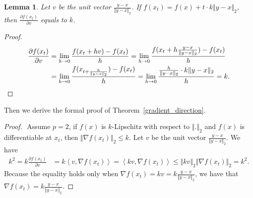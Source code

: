 \documentclass{article}
\newcommand{\tpdv}[2]{\frac{\partial{#1}}{\partial{#2}}}
\newtheorem{lemma}{Lemma}
\begin{document}
\begin{lemma}
Let $v$ be the unit vector $\frac{y-x}{\Vert y -x \Vert_2}$. If $f(x_t) = f(x)+t\cdot k\Vert y - x \Vert_2$, then $\tpdv{f(x_t)}{v}$ equals to $k$. 
\end{lemma}

\begin{proof}
\begin{equation}
\begin{aligned}
\vspace{-20pt}
\tpdv{f(x_t)}{v} 
&= \lim\limits_{h\rightarrow0} \frac{f(x_t+hv)-f(x_t)}{h} =\lim\limits_{h\rightarrow0} \frac{f(x_t+h\frac{y-x}{\Vert y-x \Vert_2})-f(x_t)}{h} \\ 
& =\lim\limits_{h\rightarrow0}\frac{f(x_{t+\frac{h}{\Vert y-x \Vert_2}})-f(x_t)}{h}  =\lim\limits_{h\rightarrow0}\frac{\frac{h}{\Vert y-x \Vert_2}\cdot k\Vert y-x \Vert_2}{h}=k. \nonumber \qedhere
\end{aligned}
\end{equation}
\end{proof}
Then we derive the formal proof of Theorem~\ref{gradient_direction}. 

\begin{proof} $ $ 
Assume $p=2$, if $f(x)$ is $k$-Lipschitz with respect to $\Vert.\Vert_2$ and $f(x)$ is differentiable at $x_t$, then $\Vert \nabla f(x_t) \Vert_2 \leq k$.  Let $v$ be the unit vector $\frac{y-x}{\Vert y -x \Vert_2}$. We have 
\begin{align}
k^2 =k\tpdv{f(x_t)}{v} &=k\left<v,\nabla f(x_t)\right>= \left<kv, \nabla f(x_t) \right> \leq \Vert kv \Vert_2\Vert \nabla f(x_t) \Vert_2 = k^2.
\end{align}
Because the equality holds only when $\nabla f(x_t) = kv = k\frac{y-x}{\Vert y -x \Vert_2}$, we have that $\nabla f(x_t) = k\frac{y-x}{\Vert y -x \Vert_2}$.
\end{proof}
\end{document}
